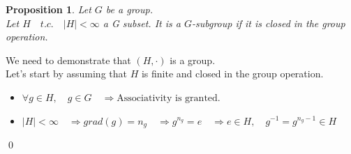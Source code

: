 \documentclass{report}
\newtheorem{prop}{Proposition}
\renewenvironment{proof}{{\noindent\bfseries Proof. }}{\qed}
\begin{document}
    \begin{prop}
        Let $G$ be a group.\\ 
        Let $H\quad t.c.\quad  |H|<\infty $ a G subset. It is a $G$-subgroup if it is closed in the group operation. 
    \end{prop}
    \begin{proof}
        We need to demonstrate that $(H,\cdot)$ is a group.\\
        Let's start by assuming that $H$ is finite and closed in the group operation.
        \begin{itemize}
            \item $\forall g \in H, \quad g \in G \quad \Rightarrow \text{Associativity is granted.}$
            \item $|H| < \infty\quad\Rightarrow grad(g)=n_g \quad\Rightarrow g^{n_g}=e \quad\Rightarrow e\in H,\quad g^{-1}=g^{n_g-1}\in H$
        \end{itemize}
        
    \end{proof}\vspace{.5cm}
    \newpage    
    
\end{document}
